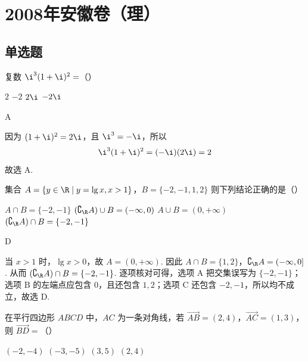 \chapter{2008年安徽卷（理）}

\section{单选题}

\begin{problem}
复数 \(\i^3 (1 + \i)^2 =\)（\quad）

\choices
    {\(2\)}
    {\(-2\)}
    {\(2\i\)}
    {\(-2\i\)}
\end{problem}

\begin{answer}
A
\end{answer}

\begin{solution}
因为 \((1+\i)^2=2\i\)，且 \(\i^3=-\i\)，所以
\[
\i^3(1+\i)^2=(-\i)(2\i)=2
\]
故选 A.
\end{solution}

\begin{problem}
集合 \(A = \{y \in \R \mid y = \lg x, x > 1\}\)，\(B = \{-2, -1, 1, 2\}\) 则下列结论正确的是（\quad）

\choices
    {\(A \cap B = \{-2, -1\}\)}
    {\((\complement_{\R}A)\cup B = (-\infty ,0)\)}
    {\(A \cup B = (0, +\infty)\)}
    {\((\complement_{\R}A)\cap B = \{-2, -1\}\)}
\end{problem}

\begin{answer}
D
\end{answer}

\begin{solution}
当 \(x>1\) 时，\(\lg x>0\)，故 \(A=(0,+\infty)\). 因此 \(A\cap B=\{1,2\}\)，\(\complement_{\R}A=(-\infty,0]\). 从而 \((\complement_{\R}A)\cap B=\{-2,-1\}\). 逐项核对可得，选项 A 把交集误写为 \(\{-2,-1\}\)；选项 B 的左端点应包含 \(0\)，且还包含 \(1,2\)；选项 C 还包含 \(-2,-1\)，所以均不成立，故选 D.
\end{solution}

\begin{problem}
在平行四边形 \(ABCD\) 中，\(AC\) 为一条对角线，若 \(\overrightarrow{AB} = (2, 4)\)，\(\overrightarrow{AC} = (1, 3)\)，则 \(\overrightarrow{BD} =\)（\quad）

\choices
    {\((-2, - 4)\)}
    {\((-3, - 5)\)}
    {\((3, 5)\)}
    {\((2, 4)\)}
\end{problem}

